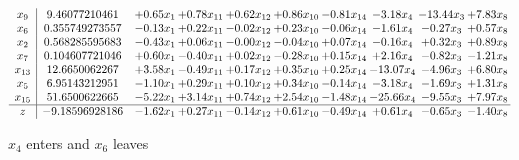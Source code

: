 \documentclass[9pt]{article}
\begin{document}
 \[\begin{array}{c| c c@{\hskip 2pt} c@{\hskip 2pt} c@{\hskip 2pt} c@{\hskip 2pt} c@{\hskip 2pt} c@{\hskip 2pt} c@{\hskip 2pt} c@{\hskip 2pt} }
 x_{9}   &  9.46077210461 & +  0.65 x_{1} & +  0.78 x_{11} & +  0.62 x_{12} & +  0.86 x_{10} & -0.81 x_{14} & -3.18 x_{4} & -13.44 x_{3} & +  7.83 x_{8}\\
 x_{6}   &  0.355749273557 & -0.13 x_{1} & +  0.22 x_{11} & -0.02 x_{12} & +  0.23 x_{10} & -0.06 x_{14} & -1.61 x_{4} & -0.27 x_{3} & +  0.57 x_{8}\\
 x_{2}   &  0.568285595683 & -0.43 x_{1} & +  0.06 x_{11} & -0.00 x_{12} & -0.04 x_{10} & +  0.07 x_{14} & -0.16 x_{4} & +  0.32 x_{3} & +  0.89 x_{8}\\
 x_{7}   &  0.104607721046 & +  0.60 x_{1} & -0.40 x_{11} & +  0.02 x_{12} & -0.28 x_{10} & +  0.15 x_{14} & +  2.16 x_{4} & -0.82 x_{3} & -1.21 x_{8}\\
 x_{13}   &  12.6650062267 & +  3.58 x_{1} & -0.49 x_{11} & +  0.17 x_{12} & +  0.35 x_{10} & +  0.25 x_{14} & -13.07 x_{4} & -4.96 x_{3} & +  6.80 x_{8}\\
 x_{5}   &  6.95143212951 & -1.10 x_{1} & +  0.29 x_{11} & +  0.10 x_{12} & +  0.34 x_{10} & -0.14 x_{14} & -3.18 x_{4} & -1.69 x_{3} & +  1.31 x_{8}\\
 x_{15}   &  51.6500622665 & -5.22 x_{1} & +  3.14 x_{11} & +  0.74 x_{12} & +  2.54 x_{10} & -1.48 x_{14} & -25.66 x_{4} & -9.55 x_{3} & +  7.97 x_{8}\\
\hline
z    &  -9.18596928186 & -1.62 x_{1} & +  0.27 x_{11} & -0.14 x_{12} & +  0.61 x_{10} & -0.49 x_{14} & +  0.61 x_{4} & -0.65 x_{3} & -1.40 x_{8}\\
\end{array}\]


 $ x_{4} $ enters and $ x_{6} $ leaves 
\end{document}
